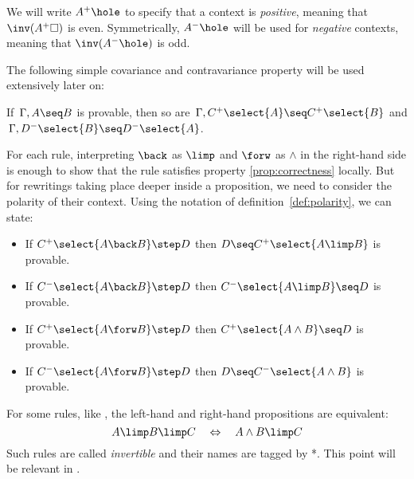 \begin{definition}\label{def:polarity}
We will write $A^+\hole$ to specify that a context is {\em positive},
meaning that $\inv(A^+\square)$ is even. Symmetrically, $A^-\hole$ will be
used for {\em negative} contexts, meaning that $\inv(A^-\hole)$ is odd.
\end{definition}
The following simple covariance and contravariance property will be used
extensively later on:
\begin{lemma}[Variance]\label{prop:cov}
  If $\, \Gamma, A\seq B$ is provable, then so are $\, \Gamma, C^+\select{A}\seq C^+\select{B}$
  and $\, \Gamma, D^-\select{B}\seq D^-\select{A}$.
\end{lemma}

For each rule, interpreting $\back$ as $\limp$ and $\forw$ as $\land$ in the
right-hand side is enough to show that the rule satisfies property
\ref{prop:correctness} locally. But for rewritings taking place deeper inside a
proposition, we need to consider the polarity of their context. Using the
notation of definition~\ref{def:polarity}, we can state:
\begin{lemma}\label{lemma:rules-valid-in-context}
  \phantom{a}
  \begin{itemize}
    \item If $C^+\select{A\back B}\step D$ then $D \seq C^+\select{A\limp B}$ is provable.
    \item If $C^-\select{A\back B} \step D$ then $C^-\select{A\limp B}\seq D$ is provable.
    \item If $C^+\select{A \forw B} \step D$ then $ C^+\select{A \land B}\seq D$ is provable.
    \item If $C^-\select{A \forw B} \step D$ then $D \seq C^-\select{A \land B}$ is provable.
  \end{itemize}
\end{lemma}
\begin{remark}
  For some rules, like , the left-hand and
  right-hand propositions are equivalent:
  $$A \limp B \limp C ~~~\Leftrightarrow~~~ A \land B \limp C$$ Such rules are
  called {\em invertible} and their names are tagged by *. This point will be
  relevant in .
\end{remark}


